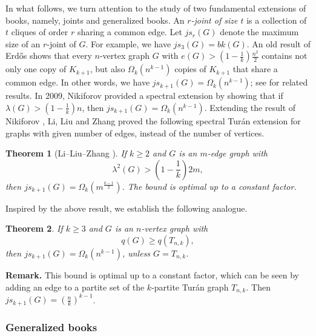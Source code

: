 \documentclass[11pt,a4paper]{article}
\theoremstyle{plain}
\newtheorem{theorem}{Theorem}[section]
\theoremstyle{definition}
\begin{document}
In what follows, 
we turn attention to the study of two fundamental extensions of books, namely, joints and generalized books.  
An \emph{$r$-joint of size $t$} is a collection of $t$ cliques of order $r$ sharing a common edge. Let $js_r(G)$ denote the maximum size of an $r$-joint of $G$. For example, we have $js_3(G) = bk(G)$. 
An old result of Erd\H{o}s \cite{Erd1969} 
shows that every $n$-vertex graph $G$ with $e(G) > (1 - \frac{1}{k}) \frac{n^2}{2}$ contains not only one copy of  $K_{k+1}$, but also $\Omega_k(n^{k-1})$ copies of $K_{k+1}$ that share a common edge. In other words, we have $js_{k+1}(G)=\Omega_k(n^{k-1})$; 
see \cite{BN2008,BN2011} for related results. 
In 2009, Nikiforov \cite{N2009} provided a spectral extension by showing that if $\lambda (G)> (1- \frac{1}{k})n$, then $js_{k+1}(G)=\Omega_k(n^{k-1})$. 
Extending the result of Nikiforov \cite{Niki2021}, Li, Liu and Zhang \cite{LLZ2024-book-4-cycle} proved the following spectral Tur\'{a}n extension for graphs with given number of edges, instead of the number of vertices.  



\begin{theorem}[Li--Liu--Zhang \cite{LLZ2024-book-4-cycle}] \label{thm-jsr+1}
    \label{thm:joints} 
    If $k\ge 2$ and $G$ is an $m$-edge graph with  
    \[  \lambda^2(G) > 
    \left(1 - \frac{1}{k} \right) 2m, \]  
    then $js_{k + 1}(G) = 
    \Omega_k (m^{\frac{k-1}{2}})$. 
    The bound is optimal up to a constant factor. 
\end{theorem}


Inspired by the above result, 
we establish the following analogue. 

\begin{theorem} \label{thm-q-js}
    If $k\ge 3$ and $G$ is an $n$-vertex graph with 
    \[ q(G) \ge  q(T_{n,k}), \]  
    then $js_{k+1}(G)=\Omega_k (n^{k-1})$,  
   unless $G=T_{n,k}$. 
\end{theorem}



\noindent 
{\bf Remark.} 
 This bound is optimal up to a constant factor, which can be seen by adding an edge to a partite set of the $k$-partite Tur\'{a}n graph $T_{n,k}$. Then $js_{k+1}(G)=(\frac{n}{k})^{k-1}$.  
 




\subsubsection{Generalized books}
\end{document}
